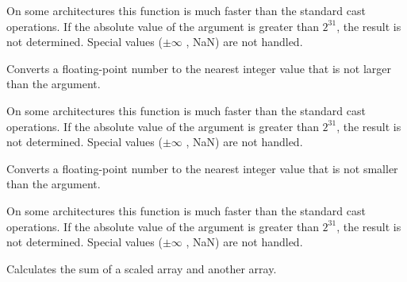 \begin{description}
\end{description}

On some architectures this function is much faster than the standard cast
operations. If the absolute value of the argument is greater than
$2^{31}$, the result is not determined. Special values ($\pm \infty$ , NaN)
are not handled.


Converts a floating-point number to the nearest integer value that is not larger than the argument.


\begin{description}
\end{description}

On some architectures this function is much faster than the standard cast
operations. If the absolute value of the argument is greater than
$2^{31}$, the result is not determined. Special values ($\pm \infty$ , NaN)
are not handled.


Converts a floating-point number to the nearest integer value that is not smaller than the argument.


\begin{description}
\end{description}

On some architectures this function is much faster than the standard cast
operations. If the absolute value of the argument is greater than
$2^{31}$, the result is not determined. Special values ($\pm \infty$ , NaN)
are not handled.

\fi


Calculates the sum of a scaled array and another array.


\begin{description}
\end{description}

